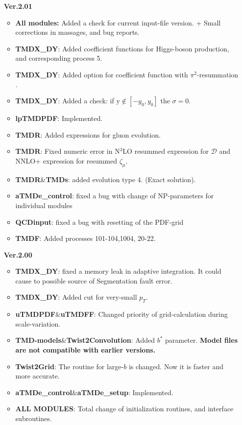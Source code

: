 \documentclass[prd,nofootinbib,eqsecnum,final]{revtex4}
\renewcommand{\(}{\left(}
\renewcommand{\)}{\right)}
\renewcommand{\[}{\left[}
\renewcommand{\]}{\right]}
\newcommand{\red}[1]{{\color[rgb]{1,0,0} #1}}
\begin{document}
\begin{itemize}
\item[\textbf{Ver.2.01}]
\begin{itemize}
	\item \textbf{All modules:} Added a check for current input-file version. + Small corrections in massages, and bug reports.
	\item \textbf{TMDX\_DY}: Added coefficient functions for Higgs-boson production, and corresponding process 5.
	\item \textbf{TMDX\_DY}: Added option for coefficient function with $\pi^2$-resummation \cite{Ahrens:2008qu}.
	\item \textbf{TMDX\_DY}: Added a check: if y$\not\in[-y_0,y_0]$ the $\sigma=0$.
	\item \textbf{lpTMDPDF}: Implemented.
	\item \textbf{TMDR}: Added expressions for gluon evolution. 
	\item \textbf{TMDR}: Fixed numeric error in N$^3$LO resummed expression for $\mathcal{D}$ and NNLO+ expression for resummed $\zeta_\mu$.
	\item \textbf{TMDR}\&\textbf{TMDs}: added evolution type 4. (Exact solution).
	\item \textbf{aTMDe\_control}: fixed a bug with change of NP-parameters for individual modules
	\item \textbf{QCDinput}: fixed a bug with resetting of the PDF-grid
	\item \textbf{TMDF}: Added processes 101-104,1004, 20-22.
\end{itemize}

\item[\textbf{Ver.2.00}]
\begin{itemize}
	\item \textbf{TMDX\_DY}: fixed a memory leak in adaptive integration. It could cause to possible source of Segmentation fault error.
	\item \textbf{TMDX\_DY}: Added cut for very-small $p_T$.
	\item \textbf{uTMDPDF}\&\textbf{uTMDFF}: Changed priority of grid-calculation during scale-variation.
	\item \textbf{TMD-models}\&\textbf{Twist2Convolution}: Added $b^*$ parameter. \textbf{Model files are not compatible with earlier versions.}
	\item \textbf{Twist2Grid}: The routine for large-$b$ is changed. Now it is faster and more accurate.
	\item \textbf{aTMDe\_control}\&\textbf{aTMDe\_setup}: Implemented.
	\item \red{\textbf{ALL MODULES}: Total change of initialization routines, and interface subroutines.}
\end{itemize}


\end{itemize}
\end{document}
